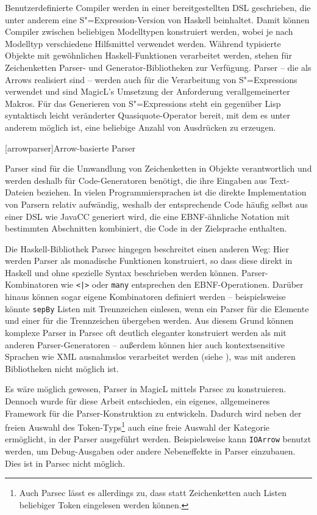 \documentclass[12pt, a4paper, bibgerm]{scrbook}
\newcommand\icode[1]{\lstinline?#1?}
\newcommand\lchapter{}
\newcommand{\sexp}{S"=Expression}
\newcommand{\sexps}{S"=Expressions}
\begin{document}
Benutzerdefinierte Compiler werden in einer bereitgestellten DSL
geschrieben, die unter anderem eine \sexp{}-Version von Haskell
beinhaltet. Damit können Compiler zwischen beliebigen Modelltypen
konstruiert werden, wobei je nach Modelltyp verschiedene Hilfsmittel
verwendet werden. Während typisierte Objekte mit gewöhnlichen
Haskell-Funktionen verarbeitet werden, stehen für Zeichenketten Parser-
und Generator-Bibliotheken zur Verfügung. Parser -- die als Arrows
realisiert sind -- werden auch für die Verarbeitung von \sexps{}
verwendet und sind MagicL's Umsetzung der Anforderung verallgemeinerter
Makros. Für das Generieren von \sexps{} steht ein gegenüber Lisp
syntaktisch leicht veränderter Quasiquote-Operator bereit, mit dem es
unter anderem möglich ist, eine beliebige Anzahl von Ausdrücken zu
erzeugen.

\lchapter[arrowparser]{Arrow-basierte Parser}

Parser sind für die Umwandlung von Zeichenketten in Objekte
verantwortlich und werden deshalb für Code-Generatoren benötigt, die
ihre Eingaben aus Text-Dateien beziehen. In vielen Programmiersprachen
ist die direkte Implementation von Parsern relativ aufwändig, weshalb
der entsprechende Code häufig selbst aus einer DSL wie JavaCC
generiert wird, die eine EBNF-ähnliche Notation mit bestimmten
Abschnitten kombiniert, die Code in der Zielsprache enthalten.

Die Haskell-Bibliothek Parsec \cite{Parsec} hingegen beschreitet einen
anderen Weg: Hier werden Parser als monadische Funktionen konstruiert,
so dass diese direkt in Haskell und ohne spezielle Syntax beschrieben
werden können. Parser-Kombinatoren wie \icode{<|>} oder \icode{many}
entsprechen den EBNF-Operationen. Darüber hinaus können sogar eigene
Kombinatoren definiert werden -- beispielsweise könnte \icode{sepBy}
Listen mit Trennzeichen einlesen, wenn ein Parser für die Elemente und
einer für die Trennzeichen übergeben werden. Aus diesem Grund können
komplexe Parser in Parsec oft deutlich eleganter konstruiert werden als
mit anderen Parser-Generatoren -- außerdem können hier auch
kontextsensitive Sprachen wie XML ausnahmslos verarbeitet werden (siehe
\cite[S. 3]{Parsec}), was mit anderen Bibliotheken nicht möglich ist.

Es wäre möglich gewesen, Parser in MagicL mittels Parsec zu
konstruieren. Dennoch wurde für diese Arbeit entschieden, ein eigenes,
allgemeineres Framework für die Parser-Konstruktion zu
entwickeln. Dadurch wird neben der freien Auswahl des
Token-Typs\footnote{Auch Parsec lässt es allerdings zu, dass statt
  Zeichenketten auch Listen beliebiger Token eingelesen werden können.}
auch eine freie Auswahl der Kategorie ermöglicht, in der Parser
ausgeführt werden. Beispielsweise kann \icode{IOArrow} benutzt werden,
um Debug-Ausgaben oder andere Nebeneffekte in Parser einzubauen. Dies
ist in Parsec nicht möglich.
\end{document}
